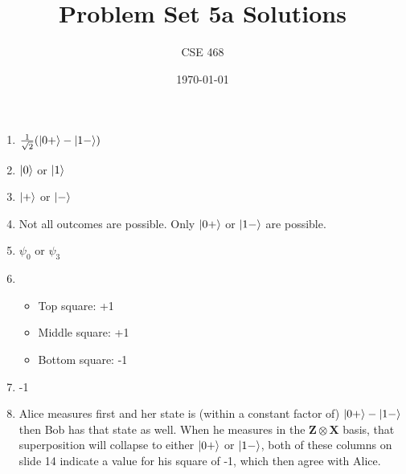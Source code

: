 \documentclass[12pt]{article}
\title{Problem Set 5a Solutions}
\author{CSE 468}
\date{\today}
\begin{document}
\maketitle

\begin{enumerate}[font=\bfseries]
    \item $\frac{1}{\sqrt{2}}(\ket{0+} - \ket{1-})$
    \item $\ket{0}$ or $\ket{1}$
    \item $\ket{+}$ or $\ket{-}$
    \item Not all outcomes are possible. Only $\ket{0+}$ or $\ket{1-}$ are possible.
    \item $\psi_0$ or $\psi_3$
    \item \begin{itemize}
        \item Top square: +1
        \item Middle square: +1
        \item Bottom square: -1
    \end{itemize}
    \item -1
    \item Alice measures first and her state is (within a constant factor of) $\ket{0+}-\ket{1-}$ then Bob has that state as well. When he measures in the $\mathbf{Z} \otimes \mathbf{X}$ basis, that superposition will collapse to either $\ket{0+}$ or $\ket{1-}$, both of these columns on slide 14 indicate a value for his square of -1, which then agree with Alice.
    
\end{enumerate}
\end{document}

